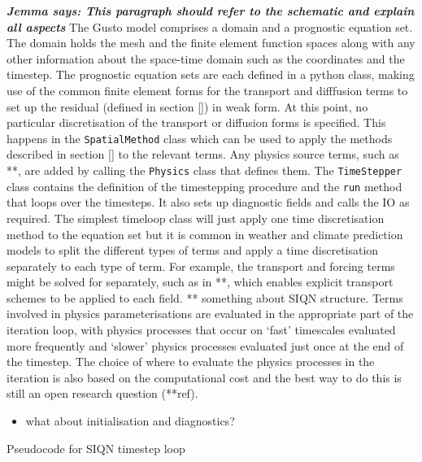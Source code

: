 \documentclass[journal abbreviation, manuscript]{copernicus}
\newcommand{\JScomment}[1]{\textit{\textbf{Jemma says: #1}}}
\begin{document}
\JScomment{This paragraph should refer to the schematic and explain
  all aspects} The Gusto model comprises a domain and a prognostic
equation set. The domain holds the mesh and the finite element
function spaces along with any other information about the space-time
domain such as the coordinates and the timestep. The prognostic
equation sets are each defined in a python class, making use of the
common finite element forms for the transport and difffusion terms to
set up the residual (defined in section \ref{}) in weak form. At this
point, no particular discretisation of the transport or diffusion
forms is specified. This happens in the \texttt{SpatialMethod} class
which can be used to apply the methods described in section \ref{} to
the relevant terms. Any physics source terms, such as **, are added by
calling the \texttt{Physics} class that defines them. The
\texttt{TimeStepper} class contains the definition of the timestepping
procedure and the \texttt{run} method that loops over the
timesteps. It also sets up diagnostic fields and calls the IO as
required. The simplest timeloop class will just apply one time
discretisation method to the equation set but it is common in weather
and climate prediction models to split the different types of terms
and apply a time discretisation separately to each type of term. For
example, the transport and forcing terms might be solved for
separately, such as in **, which enables explicit transport schemes to
be applied to each field. ** something about SIQN structure. Terms
involved in physics parameterisations are evaluated in the appropriate
part of the iteration loop, with physics processes that occur on
`fast' timescales evaluated more frequently and `slower' physics
processes evaluated just once at the end of the timestep. The choice
of where to evaluate the physics processes in the iteration is also
based on the computational cost and the best way to do this is still
an open research question (**ref).

\begin{itemize}
\item what about initialisation and diagnostics?
\end{itemize}

\begin{algorithm}
  \caption{Pseudocode for SIQN timestep loop}\label{alg:SIQN}
  \begin{algorithmic}
    \STATE
  \end{algorithmic}
\end{algorithm}
\end{document}
